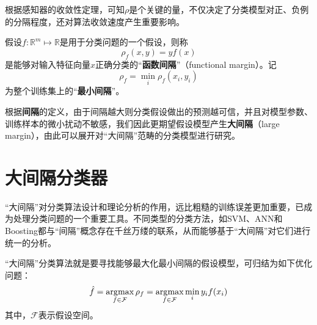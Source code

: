 根据感知器的收敛性定理，可知$\rho$是个关键的量，不仅决定了分类模型对正、负例的分隔程度，还对算法收敛速度产生重要影响。
\begin{definition}
假设$f:\mathbb{R}^m \mapsto \mathbb{R}$是用于分类问题的一个假设，则称
\begin{equation}
    \rho_f(x,y) = y f(x)
\end{equation}
是能够对输入特征向量$x$正确分类的“\textbf{函数间隔}”（functional margin）。记
\begin{equation}
    \rho_f = \min\limits_i \rho_f(x_i,y_i)
\end{equation}
为整个训练集上的“\textbf{最小间隔}”。
\end{definition}

根据\textbf{间隔}的定义，由于间隔越大则分类假设做出的预测越可信，并且对模型参数、训练样本的微小扰动不敏感，我们因此更期望假设模型产生\textbf{大间隔}（large margin），由此可以展开对“大间隔”范畴的分类模型进行研究。

\section{大间隔分类器}
“大间隔”对分类算法设计和理论分析的作用，远比粗糙的训练误差更加重要，已成为处理分类问题的一个重要工具。不同类型的分类方法，如SVM、ANN和Boosting都与“间隔”概念存在千丝万缕的联系，从而能够基于“大间隔”对它们进行统一的分析。

“大间隔”分类算法就是要寻找能够最大化最小间隔的假设模型，可归结为如下优化问题：
\begin{equation}\label{eq:larginmargin}
    \hat f = \operatorname*{\mathrm{\arg\!\max}}\limits_{f\in \mathcal F} \rho_f = \operatorname*{\mathrm{\arg\!\max}}\limits_{f\in \mathcal F} \min\limits_i y_i f(x_i)
\end{equation}
其中，$\mathcal F$表示假设空间。

